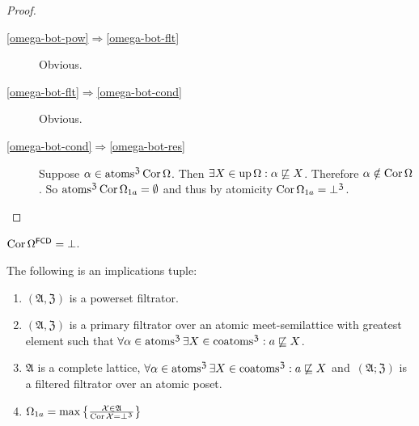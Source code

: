 \begin{proof}
~
\begin{description}
\item[\ref{omega-bot-pow}$\Rightarrow$\ref{omega-bot-flt}]
  Obvious.
\item[\ref{omega-bot-flt}$\Rightarrow$\ref{omega-bot-cond}]
  Obvious.
\item[\ref{omega-bot-cond}$\Rightarrow$\ref{omega-bot-res}]
  Suppose $\alpha \in \operatorname{atoms}^{\mathfrak{Z}} \operatorname{Cor} \Omega$. Then
  $\exists X \in \operatorname{up} \Omega : \alpha \not\sqsubseteq X$.
  Therefore $\alpha \notin \operatorname{Cor} \Omega$. So $\operatorname{atoms}^{\mathfrak{Z}}
  \operatorname{Cor} \Omega_{1 a} = \emptyset$ and thus by atomicity $\operatorname{Cor}
  \Omega_{1 a} = \bot^{\mathfrak{Z}}$.
\end{description}
\end{proof}

\begin{cor}
  $\operatorname{Cor} \Omega^{\mathsf{FCD}} = \bot$.
\end{cor}

\begin{prop}
The following is an implications tuple:
\begin{enumerate}
\item\label{om-max-pow} $(\mathfrak{A},\mathfrak{Z})$ is a powerset filtrator.
\item\label{om-max-flt} $(\mathfrak{A},\mathfrak{Z})$ is a primary filtrator
  over an atomic meet-semilattice with greatest element such that
  $\forall \alpha \in
  \operatorname{atoms}^{\mathfrak{Z}} \exists X \in \operatorname{coatoms}^{\mathfrak{Z}}: a
  \not\sqsubseteq X$.
\item\label{om-max-cond} $\mathfrak{A}$ is
  a complete lattice,
  $\forall \alpha \in
  \operatorname{atoms}^{\mathfrak{Z}} \exists X \in \operatorname{coatoms}^{\mathfrak{Z}}: a
  \not\sqsubseteq X$ and~$(\mathfrak{A}; \mathfrak{Z})$ is a filtered filtrator over an atomic poset.
\item\label{om-max-res} $\Omega_{1 a} = \max \left\{ \frac{ \mathcal{X} \in \mathfrak{A} }{
  \operatorname{Cor} \mathcal{X} = \bot^{\mathfrak{Z}} }\right\}$
\end{enumerate}
\end{prop}

